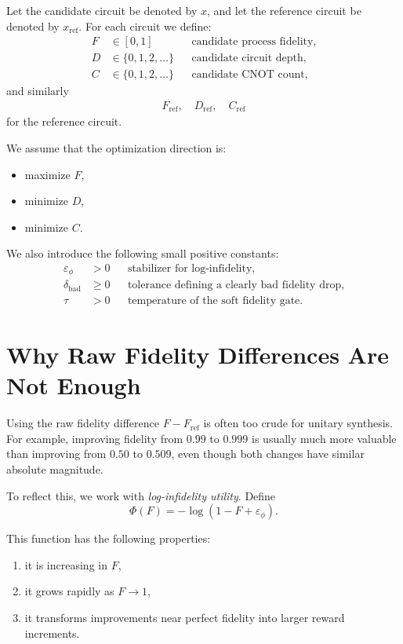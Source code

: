 \documentclass[11pt]{article}
\begin{document}
Let the candidate circuit be denoted by $x$, and let the reference circuit be denoted by $x_{\mathrm{ref}}$.
For each circuit we define:
\begin{align}
    F &\in [0,1] &&\text{candidate process fidelity,} \\
    D &\in \{0,1,2,\dots\} &&\text{candidate circuit depth,} \\
    C &\in \{0,1,2,\dots\} &&\text{candidate CNOT count,}
\end{align}
and similarly
\begin{align}
    F_{\mathrm{ref}},\quad D_{\mathrm{ref}},\quad C_{\mathrm{ref}}
\end{align}
for the reference circuit.

We assume that the optimization direction is:
\begin{itemize}
    \item maximize $F$,
    \item minimize $D$,
    \item minimize $C$.
\end{itemize}

We also introduce the following small positive constants:
\begin{align}
    \varepsilon_{\phi} &> 0 &&\text{stabilizer for log-infidelity,} \\
    \delta_{\mathrm{bad}} &\ge 0 &&\text{tolerance defining a clearly bad fidelity drop,} \\
    \tau &> 0 &&\text{temperature of the soft fidelity gate.}
\end{align}

\section{Why Raw Fidelity Differences Are Not Enough}

Using the raw fidelity difference $F-F_{\mathrm{ref}}$ is often too crude for unitary synthesis.
For example, improving fidelity from $0.99$ to $0.999$ is usually much more valuable than improving from $0.50$ to $0.509$, even though both changes have similar absolute magnitude.

To reflect this, we work with \emph{log-infidelity utility}.
Define
\begin{equation}
    \Phi(F) = -\log(1-F+\varepsilon_{\phi}).
\end{equation}

This function has the following properties:
\begin{enumerate}[label=(\alph*)]
    \item it is increasing in $F$,
    \item it grows rapidly as $F \to 1$,
    \item it transforms improvements near perfect fidelity into larger reward increments.
\end{enumerate}
\end{document}
